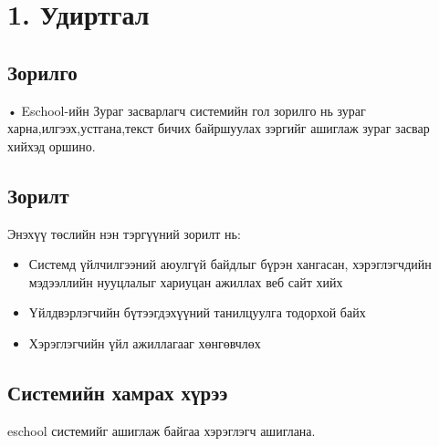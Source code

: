 \chapter{1.	Удиртгал }
\label{chap:intro}
\section{Зорилго}
•  Eschool-ийн Зураг засварлагч системийн гол зорилго нь зураг харна,илгээх,устгана,текст бичих байршуулах зэргийг ашиглаж зураг засвар хийхэд оршино.


\section{Зорилт} 


Энэхүү төслийн нэн тэргүүний зорилт нь:

\begin{itemize}
	
	\item Системд үйлчилгээний аюулгүй байдлыг бүрэн хангасан, хэрэглэгчдийн мэдээллийн нууцлалыг хариуцан ажиллах веб сайт хийх
	
	\item Үйлдвэрлэгчийн бүтээгдэхүүний танилцуулга тодорхой байх
	
	\item Хэрэглэгчийн үйл ажиллагааг хөнгөвчлөх
	
\end{itemize}




\section{Системийн хамрах хүрээ }
eschool системийг ашиглаж байгаа хэрэглэгч ашиглана. 
